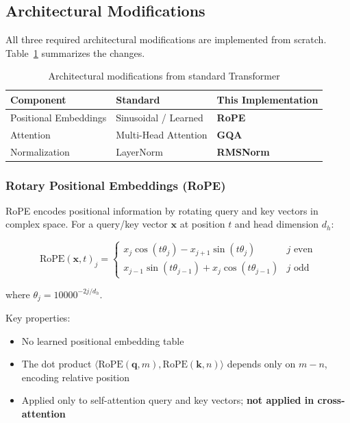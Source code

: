 \documentclass[12pt,a4paper]{article}
\begin{document}
\subsection{Architectural Modifications}

All three required architectural modifications are implemented from scratch. Table~\ref{tab:arch_mods} summarizes the changes.

\begin{table}[H]
\centering
\caption{Architectural modifications from standard Transformer}
\label{tab:arch_mods}
\begin{tabular}{lll}
\toprule
\textbf{Component} & \textbf{Standard} & \textbf{This Implementation} \\
\midrule
Positional Embeddings & Sinusoidal / Learned & \textbf{RoPE} \cite{su2021roformer} \\
Attention & Multi-Head Attention & \textbf{GQA} \cite{ainslie2023gqa} \\
Normalization & LayerNorm & \textbf{RMSNorm} \cite{zhang2019rmsnorm} \\
\bottomrule
\end{tabular}
\end{table}

\subsubsection{Rotary Positional Embeddings (RoPE)}

RoPE encodes positional information by rotating query and key vectors in complex space. For a query/key vector $\mathbf{x}$ at position $t$ and head dimension $d_h$:

\[
\text{RoPE}(\mathbf{x}, t)_j = \begin{cases}
x_j \cos(t\theta_j) - x_{j+1}\sin(t\theta_j) & j \text{ even} \\
x_{j-1}\sin(t\theta_{j-1}) + x_j\cos(t\theta_{j-1}) & j \text{ odd}
\end{cases}
\]

where $\theta_j = 10000^{-2j/d_h}$.

Key properties:
\begin{itemize}
    \item No learned positional embedding table
    \item The dot product $\langle\text{RoPE}(\mathbf{q}, m), \text{RoPE}(\mathbf{k}, n)\rangle$ depends only on $m-n$, encoding relative position
    \item Applied only to self-attention query and key vectors; \textbf{not applied in cross-attention}
\end{itemize}
\end{document}
